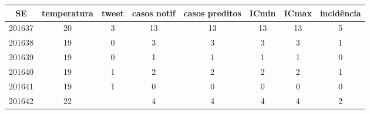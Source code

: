 \begin{tabular}{c|ccccccc}
  \hline
SE & temperatura & tweet & casos notif & casos preditos & ICmin & ICmax & incidência \\ 
  \hline
201637 & 20 & 3 & 13 & 13 & 13 & 13 & 5 \\ 
  201638 & 19 & 0 & 3 & 3 & 3 & 3 & 1 \\ 
  201639 & 19 & 0 & 1 & 1 & 1 & 1 & 0 \\ 
  201640 & 19 & 1 & 2 & 2 & 2 & 2 & 1 \\ 
  201641 & 19 & 1 & 0 & 0 & 0 & 0 & 0 \\ 
  201642 & 22 &  & 4 & 4 & 4 & 4 & 2 \\ 
   \hline
\end{tabular}
